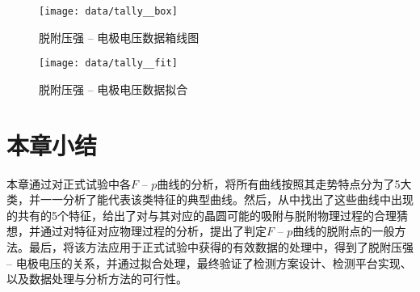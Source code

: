 \begin{figure}[thbp]
\centering
\texttt{[image: data/tally\_\_box]}
\caption{脱附压强 -- 电极电压数据箱线图}
\label{fig:data-tally-box}
\end{figure}

\begin{figure}[thbp]
\centering
\texttt{[image: data/tally\_\_fit]}
\caption{脱附压强 -- 电极电压数据拟合}
\label{fig:data-tally-fit}
\end{figure}



\section{本章小结}\label{sec:analysis-summary}

本章通过对正式试验中各$F$ -- $p$曲线的分析，将所有曲线按照其走势特点分为了5大类，并一一分析了能代表该类特征的典型曲线。然后，从中找出了这些曲线中出现的共有的5个特征，给出了对与其对应的晶圆可能的吸附与脱附物理过程的合理猜想，并通过对特征对应物理过程的分析，提出了判定$F$ -- $p$曲线的脱附点的一般方法。最后，将该方法应用于正式试验中获得的有效数据的处理中，得到了脱附压强 -- 电极电压的关系，并通过拟合处理，最终验证了检测方案设计、检测平台实现、以及数据处理与分析方法的可行性。